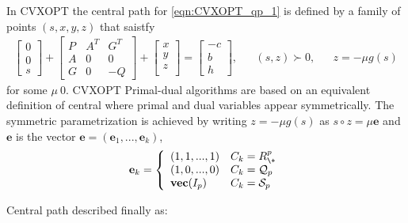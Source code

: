 In CVXOPT the central path for \ref{eqn:CVXOPT_qp_1} is defined by a family of points $(s,x,y,z)$ that saistfy
\begin{equation}
	\begin{aligned}
		\begin{bmatrix}
			0\\
			0\\
			s
		\end{bmatrix}
		+
		\begin{bmatrix}
			P & A^T & G^T\\
			A & 0 & 0\\
			G & 0 & -Q
		\end{bmatrix}
		+\begin{bmatrix}
			x\\
			y\\
			z\\
		\end{bmatrix}
		=
		\begin{bmatrix}
			-c\\
			b\\
			h
		\end{bmatrix}
		,
		& & (s,z)\succ 0, & & z=-\mu g(s)
	\end{aligned}
	\label{eqn:cvxopt_central_path_1}
\end{equation}
for some $\mu \> 0$. CVXOPT Primal-dual algorithms are based on an equivalent definition of central where primal and dual variables appear symmetrically. The symmetric parametrization is achieved by writing $z=-\mu g(s)$ as $s \circ z=\mu \textbf{e}$ and $\textbf{e}$ is the vector $\textbf{e}=(\textbf{e}_1,...,\textbf{e}_k)$,
\begin{equation*}
	\begin{aligned}
		\textbf{e}_k = 
		\left\{
                \begin{array}{ll}
                  (1,1,...,1) & C_k=R_{\+}^p \\
                  (1,0,...,0) & C_k=\mathcal{Q}_p \\
                  \textbf{vec}(I_p) & C_k = \mathcal{S}_p
                \end{array}
              \right.
	\end{aligned}
\end{equation*}

Central path described finally as:


